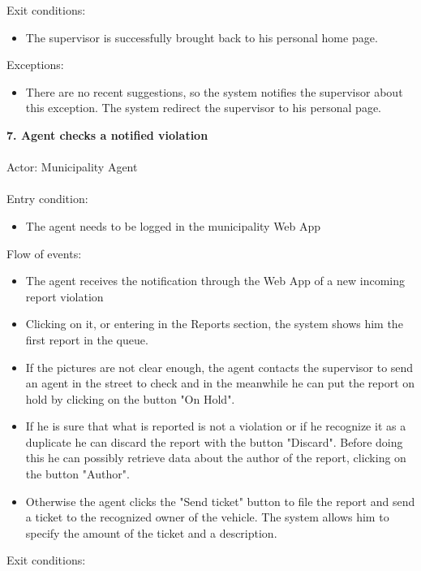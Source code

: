 \documentclass[a4paper]{report}
\begin{document}
Exit conditions:
\begin{itemize}
\item The supervisor is successfully brought back to his personal home page.
\end{itemize}
Exceptions:
\begin{itemize}
\item There are no recent suggestions, so the system notifies the supervisor about this exception. The system redirect the supervisor to his personal page.
\end{itemize}
\textbf{7. Agent checks a notified violation}\label{uc:7}
\\ \\
Actor: Municipality Agent \\ \\
Entry condition: 	
\begin{itemize}
\item The agent needs to be logged in the municipality Web App
\end{itemize}
Flow of events:
\begin{itemize} 
\item The agent receives the notification through the Web App of a new incoming report violation
\item Clicking on it, or entering in the Reports section, the system shows him the first report in the queue.
\item If the pictures are not clear enough, the agent contacts the supervisor to send an agent in the street to check and in the meanwhile he can put the report on hold by clicking on the button "On Hold".
\item If he is sure that what is reported is not a violation or if he recognize it as a duplicate he can discard the report with the button "Discard". Before doing this he can possibly retrieve data about the author of the report, clicking on the button "Author".
\item Otherwise the agent clicks the "Send ticket" button to file the report and send a ticket to the recognized owner of the vehicle. The system allows him to specify the amount of the ticket and a description.
\end{itemize}
Exit conditions:
\end{document}
